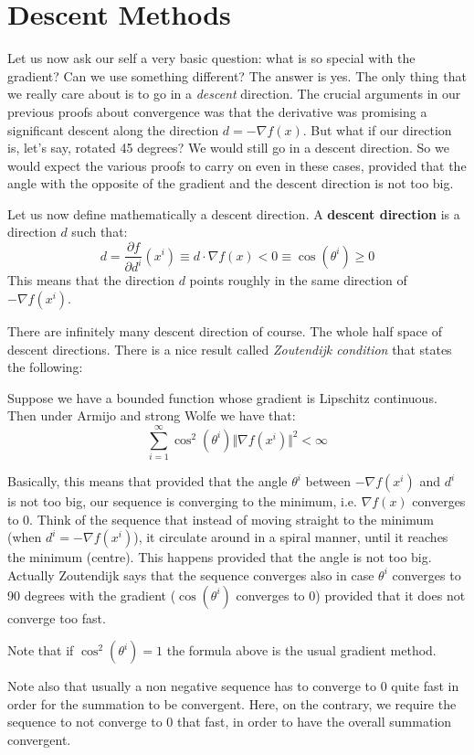 \section{Descent Methods}
\par Let us now ask our self a very basic question: what is so special with the gradient? Can we use something different? The answer is yes. The only thing that we really care about is to go in a \textit{descent} direction. The crucial arguments in our previous proofs about convergence was that the derivative was promising a significant descent along the direction $d = -\nabla f(x)$. But what if our direction is, let's say, rotated 45 degrees? We would still go in a descent direction. So we would expect the various proofs to carry on even in these cases, provided that the angle with the opposite of the gradient and the descent direction is not too big.
\par Let us now define mathematically a descent direction. A \textbf{descent direction} is a direction $d$ such that:
\begin{equation}
    d = \frac{\partial f}{\partial d^i}(x^i) \equiv d \cdot \nabla f(x) < 0 \equiv \cos (\theta^i) \geq 0
\end{equation}
This means that the direction $d$ points roughly in the same direction of $-\nabla f(x^i)$.
\par There are infinitely many descent direction of course. The whole half space of descent directions. There is a nice result called \textit{Zoutendijk condition} that states the following:
\begin{theorem}
    Suppose we have a bounded function whose gradient is Lipschitz continuous. Then under Armijo and strong Wolfe we have that:
    \begin{equation}
        \sum_{i=1}^\infty \cos^2(\theta^i)\Vert \nabla f(x^i) \Vert^2 < \infty
    \end{equation}
\end{theorem}
Basically, this means that provided that the angle $\theta^i$ between $-\nabla f(x^i)$ and $d^i$ is not too big, our sequence is converging to the minimum, i.e. $\nabla f(x)$ converges to 0. Think of the sequence that instead of moving straight to the minimum (when $d^i = -\nabla f(x^i)$), it circulate around in a spiral manner, until it reaches the minimum (centre). This happens provided that the angle is not too big. Actually Zoutendijk says that the sequence converges also in case $\theta^i$ converges to 90 degrees with the gradient ($\cos (\theta^i)$ converges to 0) provided that it does not converge too fast.
\par Note that if $\cos^2(\theta^i) = 1$ the formula above is the usual gradient method.
\par Note also that usually a non negative sequence has to converge to 0 quite fast in order for the summation to be convergent. Here, on the contrary, we require the sequence to not converge to 0 that fast, in order to have the overall summation convergent.
%
%
%

